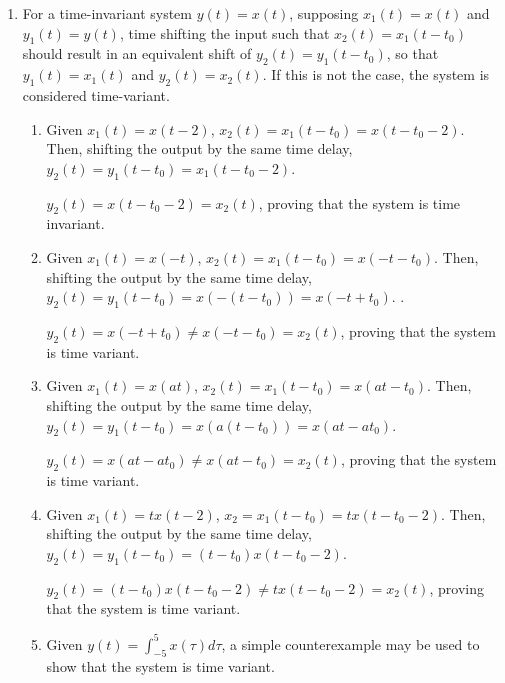 \documentclass{article}
\begin{document}
\begin{enumerate}[label=\thesubsubsection]
		\setcounter{subsection}{7}
    \setcounter{subsubsection}{2}
		\item
			For a time-invariant system \(y(t) = x(t)\), supposing \(x_1(t) = x(t)\) and \(y_1(t) = y(t)\), time shifting the input such that \(x_2(t) = x_1(t-t_0)\) should result in an equivalent shift of \(y_2(t) = y_1(t-t_0)\), so that \(y_1(t) = x_1(t)\) and \(y_2(t) = x_2(t).\) If this is not the case, the system is considered time-variant.
		\begin{enumerate}[label=\alph*)]
			\item
				Given \(x_1(t) = x(t-2)\), \(x_2(t) = x_1(t-t_0) = x(t-t_0-2)\). Then, shifting the output by the same time delay, \(y_2(t) = y_1(t-t_0) = x_1(t-t_0-2)\). 
				
				\(y_2(t) = x(t-t_0-2) = x_2(t)\), proving that the system is time invariant.
			 \item
				 Given \(x_1(t) = x(-t)\), \(x_2(t) = x_1(t-t_0) = x(-t-t_0)\). Then, shifting the output by the same time delay, \(y_2(t) = y_1(t-t_0) = x(-(t-t_0)) = x(-t+t_0).\) . 

				 \(y_2(t) = x(-t+t_0) \neq x(-t-t_0) = x_2(t)\), proving that the system is time variant.
			 \item 
				 Given \(x_1(t) = x(at)\), \(x_2(t) = x_1(t-t_0) = x(at-t_0)\). Then, shifting the output by the same time delay, \(y_2(t) = y_1(t-t_0) = x(a(t - t_0)) = x(at-at_0)\).  

				 \(y_2(t) = x(at-at_0) \neq x(at-t_0) = x_2(t)\), proving that the system is time variant.
			 \item 
				 Given \(x_1(t) = tx(t-2)\), \(x_2 = x_1(t-t_0) = tx(t-t_0-2)\). Then, shifting the output by the same time delay, \(y_2(t) = y_1(t-t_0) = (t-t_0)x(t-t_0-2)\). 

				 \(y_2(t) = (t-t_0)x(t-t_0-2) \neq tx(t-t_0-2) = x_2(t)\), proving that the system is time variant.

				 \item
					Given \(y(t) = \int_{-5}^{5}x(\tau)d\tau\), a simple counterexample may be used to show that the system is time variant.


\end{enumerate}
\end{enumerate}
\end{document}
